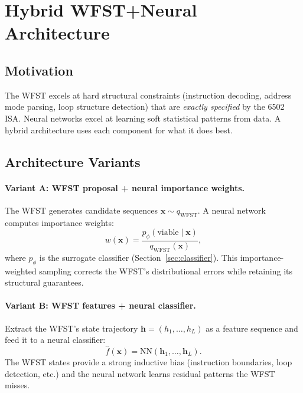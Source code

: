 \documentclass{article}
\begin{document}
\section{Hybrid WFST+Neural Architecture}
\label{sec:hybrid}

\subsection{Motivation}

The WFST excels at hard structural constraints (instruction decoding,
address mode parsing, loop structure detection) that are \emph{exactly
specified} by the 6502 ISA.  Neural networks excel at learning soft
statistical patterns from data.  A hybrid architecture uses each component
for what it does best.

\subsection{Architecture Variants}

\paragraph{Variant A: WFST proposal + neural importance weights.}
The WFST generates candidate sequences $\mathbf{x} \sim q_{\text{WFST}}$.
A neural network computes importance weights:
\begin{equation}
  w(\mathbf{x}) = \frac{p_\phi(\text{viable} \mid \mathbf{x})}
                       {q_{\text{WFST}}(\mathbf{x})},
\end{equation}
where $p_\phi$ is the surrogate classifier (Section~\ref{sec:classifier}).
This importance-weighted sampling corrects the WFST's distributional
errors while retaining its structural guarantees.

\paragraph{Variant B: WFST features + neural classifier.}
Extract the WFST's state trajectory
$\mathbf{h} = (h_1, \ldots, h_L)$ as a feature sequence and feed it
to a neural classifier:
\begin{equation}
  \hat{f}(\mathbf{x}) = \text{NN}(\mathbf{h}_1, \ldots, \mathbf{h}_L).
\end{equation}
The WFST states provide a strong inductive bias (instruction boundaries,
loop detection, etc.) and the neural network learns residual patterns
the WFST misses.
\end{document}

